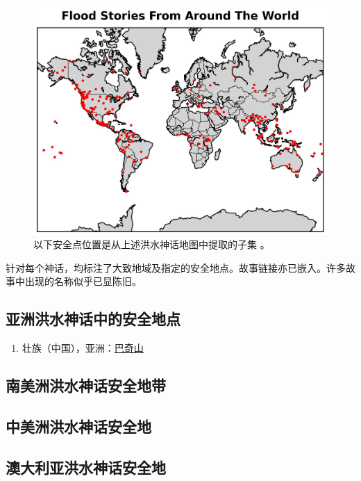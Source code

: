 \documentclass[10pt,twocolumn,letterpaper]{article}
\begin{document}
\begin{figure}[H]
\begin{center}
   \includegraphics[width=1\linewidth]{flood.jpg}
\end{center}
   \caption{以下安全点位置是从上述洪水神话地图中提取的子集 \cite{2,17}。}
\label{fig:21}
\label{fig:onecol}
\end{figure}

针对每个神话，均标注了大致地域及指定的安全地点。故事链接亦已嵌入。许多故事中出现的名称似乎已显陈旧。
\subsection{亚洲洪水神话中的安全地点}

\begin{flushleft}
\begin{enumerate}
\item 壮族（中国），亚洲：\href{http://www.talkorigins.org/faqs/flood-myths.html#Zhuang}{巴奇山}
\end{enumerate}
\end{flushleft}

\subsection{南美洲洪水神话安全地带}
\subsection{中美洲洪水神话安全地}

\subsection{澳大利亚洪水神话安全地}
\end{document}
